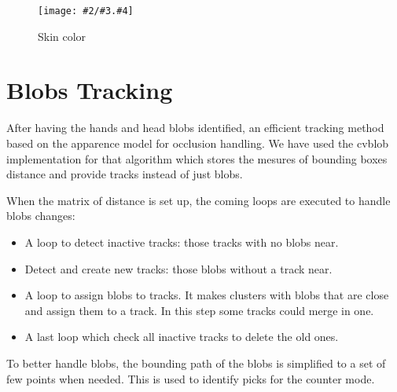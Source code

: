 \documentclass{llncs}
\newcommand{\imagepathext}[5]{%
\begin{figure}[!htbp]
\hfil\texttt{[image: \#2/\#3.\#4]}\hfil
\caption{#5\label{#3}}
\end{figure}}
\newcommand{\png}[2]{\imagepathext{width=\columnwidth}{pics}{#1}{png}{#2}}
\begin{document}
\png{skincolor}{Skin color}
\section{Blobs Tracking}
After having the hands and head blobs identified, an efficient
tracking method based on the apparence model for occlusion handling\cite{app06}.
We have used the cvblob implementation \cite{cvblob} for that algorithm which 
stores the mesures of bounding boxes distance and provide tracks instead of just blobs.  %

When the matrix of distance is set up, the coming loops
are executed to handle blobs changes:
\begin{itemize}
 \item A loop to detect inactive tracks: those tracks with no blobs near.
 \item Detect and create new tracks: those blobs without a track near.
 \item A loop to assign blobs to tracks. It makes clusters with blobs that are close and assign them to a track.
In this step some tracks could merge in one.
 \item A last loop which check all inactive tracks to delete the old ones.
\end{itemize}

To better handle blobs, the bounding path of the blobs
is simplified to a set of few points when needed.
This is used to identify picks for the counter mode.
\end{document}
